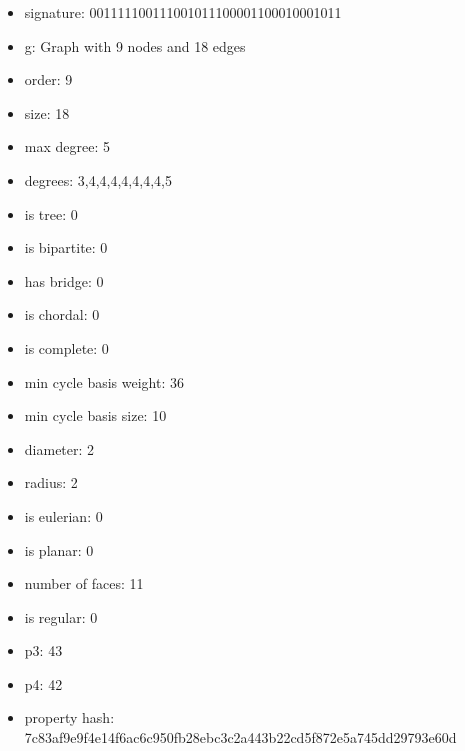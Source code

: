 \newpage
\begin{figure}
\end{figure}
\begin{itemize}
\item signature: 001111100111001011100001100010001011
\item g: Graph with 9 nodes and 18 edges
\item order: 9
\item size: 18
\item max degree: 5
\item degrees: 3,4,4,4,4,4,4,4,5
\item is tree: 0
\item is bipartite: 0
\item has bridge: 0
\item is chordal: 0
\item is complete: 0
\item min cycle basis weight: 36
\item min cycle basis size: 10
\item diameter: 2
\item radius: 2
\item is eulerian: 0
\item is planar: 0
\item number of faces: 11
\item is regular: 0
\item p3: 43
\item p4: 42
\item property hash: 7c83af9e9f4e14f6ac6c950fb28ebc3c2a443b22cd5f872e5a745dd29793e60d
\end{itemize}
